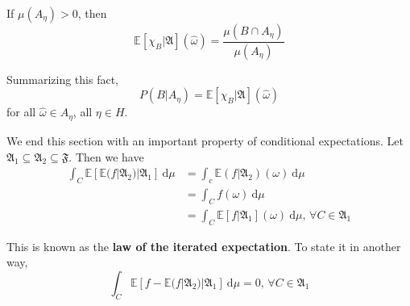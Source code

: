 If $\mu(A_\eta) > 0$, then
\[
	\mathbb{E}[\chi_B | \mathfrak{A}](\hat{\omega}) = \frac{\mu(B \cap A_\eta)}{\mu(A_\eta)}
\]

Summarizing this fact,
\[
	P(B | A_\eta) = \mathbb{E}[\chi_B | \mathfrak{A}](\hat{\omega})
\]
for all $\hat{\omega} \in A_\eta$, all $\eta \in H$.

We end this section with an important property of conditional expectations. Let $\mathfrak{A}_1 \subseteq \mathfrak{A}_2 \subseteq \mathfrak{F}$. Then we have
\begin{equation*}
	\begin{aligned}
		\int_C \mathbb{E} [\mathbb{E}(f | \mathfrak{A}_2) | \mathfrak{A}_1] ~\mathrm{d}\mu &= \int_c \mathbb{E}(f | \mathfrak{A}_2)(\omega) ~\mathrm{d}\mu \\
		&= \int_C f(\omega) ~\mathrm{d}\mu \\
		&= \int_C \mathbb{E} [f | \mathfrak{A}_1](\omega) ~\mathrm{d}\mu, \, \forall C \in \mathfrak{A}_1
	\end{aligned}
\end{equation*}

This is known as the \textbf{law of the iterated expectation}. To state it in another way,
\[
	\int_C \mathbb{E} [f - \mathbb{E}(f | \mathfrak{A}_2) | \mathfrak{A}_1] ~\mathrm{d}\mu = 0, \, \forall C \in \mathfrak{A}_1
\]